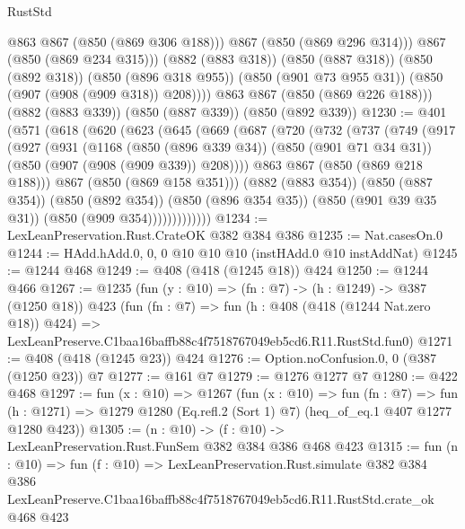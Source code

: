 \begin{lexlean}{RustStd}
\begin{coremodule}
                @863
                @867
                (@850 (@869 @306 @188)))
              @867
              (@850 (@869 @296 @314)))
            @867
            (@850 (@869 @234 @315)))
          (@882 (@883 @318))
          (@850 (@887 @318))
          (@850 (@892 @318))
          (@850 (@896 @318 @955))
          (@850 (@901 @73 @955 @31))
          (@850 (@907 (@908 (@909 @318)) @208))))
      @863
      @867
      (@850 (@869 @226 @188)))
    (@882 (@883 @339))
    (@850 (@887 @339))
    (@850 (@892 @339))
@1230 := @401
    (@571
      (@618
        (@620
          (@623
            (@645
              (@669
                (@687
                  (@720
                    (@732
                      (@737
                        (@749
                          (@917
                            (@927
                              (@931
                                (@1168
                                  (@850 (@896 @339 @34))
                                  (@850 (@901 @71 @34 @31))
                                  (@850 (@907 (@908 (@909 @339)) @208))))
                              @863
                              @867
                              (@850 (@869 @218 @188)))
                            @867
                            (@850 (@869 @158 @351)))
                          (@882 (@883 @354))
                          (@850 (@887 @354))
                          (@850 (@892 @354))
                          (@850 (@896 @354 @35))
                          (@850 (@901 @39 @35 @31))
                          (@850 (@909 @354)))))))))))))
@1234 := LexLeanPreservation.Rust.CrateOK @382 @384 @386
@1235 := Nat.casesOn.{0}
@1244 := HAdd.hAdd.{0, 0, 0} @10 @10 @10 (instHAdd.{0} @10 instAddNat)
@1245 := @1244 @468
@1249 := @408 (@418 (@1245 @18)) @424
@1250 := @1244 @466
@1267 := @1235
    (fun (y : @10) => (fn : @7) -> (h : @1249) -> @387 (@1250 @18))
    @423
    (fun (fn : @7) =>
    fun (h : @408 (@418 (@1244 Nat.zero @18)) @424) =>
    LexLeanPreserve.C1baa16baffb88c4f7518767049eb5cd6.R11.RustStd.fun0)
@1271 := @408 (@418 (@1245 @23)) @424
@1276 := Option.noConfusion.{0, 0} (@387 (@1250 @23)) @7
@1277 := @161 @7
@1279 := @1276 @1277 @7
@1280 := @422 @468
@1297 := fun (x : @10) =>
  @1267
    (fun (x : @10) =>
    fun (fn : @7) =>
    fun (h : @1271) => @1279 @1280 (Eq.refl.{2} (Sort 1) @7) (heq_of_eq.{1} @407 @1277 @1280 @423))
@1305 := (n : @10) -> (f : @10) -> LexLeanPreservation.Rust.FunSem @382 @384 @386 @468 @423
@1315 := fun (n : @10) =>
  fun (f : @10) =>
  LexLeanPreservation.Rust.simulate
    @382
    @384
    @386
    LexLeanPreserve.C1baa16baffb88c4f7518767049eb5cd6.R11.RustStd.crate_ok
    @468
    @423
\end{coremodule}
\end{lexlean}
